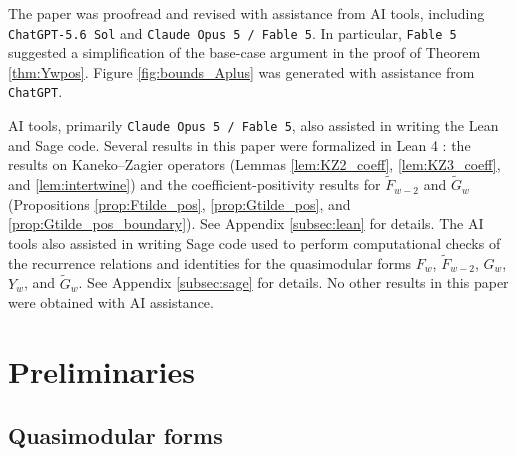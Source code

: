 \documentclass[10pt,reqno]{amsproc}
\newcommand{\wtilde}{\widetilde}
\newcommand{\1}{\mathds{1}}	%
\theoremstyle{definition}
\theoremstyle{remark}
\begin{document}
The paper was proofread and revised with assistance from AI tools, including \texttt{ChatGPT-5.6 Sol} and \texttt{Claude Opus 5 / Fable 5}.
In particular, \texttt{Fable 5} suggested a simplification of the base-case argument in the proof of Theorem \ref{thm:Ywpos}.
Figure \ref{fig:bounds_Aplus} was generated with assistance from \texttt{ChatGPT}.

AI tools, primarily \texttt{Claude Opus 5 / Fable 5}, also assisted in writing the Lean and Sage code.
Several results in this paper were formalized in Lean 4 \cite{moura2021lean}: the results on Kaneko--Zagier operators (Lemmas \ref{lem:KZ2_coeff}, \ref{lem:KZ3_coeff}, and \ref{lem:intertwine}) and the coefficient-positivity results for $\wtilde{F}_{w-2}$ and $\wtilde{G}_w$ (Propositions \ref{prop:Ftilde_pos}, \ref{prop:Gtilde_pos}, and \ref{prop:Gtilde_pos_boundary}). See Appendix \ref{subsec:lean} for details.
The AI tools also assisted in writing Sage \cite{sagemath} code used to perform computational checks of the recurrence relations and identities for the quasimodular forms $F_w$, $\wtilde{F}_{w-2}$, $G_w$, $Y_w$, and $\wtilde{G}_w$.
See Appendix \ref{subsec:sage} for details.
No other results in this paper were obtained with AI assistance.

\section{Preliminaries}


\subsection{Quasimodular forms}
\end{document}

